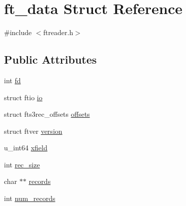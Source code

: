 \hypertarget{structft__data}{\section{ft\-\_\-data \-Struct \-Reference}
\label{structft__data}
}


{\ttfamily \#include $<$ftreader.\-h$>$}

\subsection*{\-Public \-Attributes}
\begin{DoxyCompactItemize}
\item 
int \hyperlink{structft__data_a6a6288892831b358a2f899cf3182467d}{fd}
\item 
struct ftio \hyperlink{structft__data_ab6231c0f90cc6f0dd190d52d6926d54b}{io}
\item 
struct fts3rec\-\_\-offsets \hyperlink{structft__data_a4e2b828b9122744d5cb7fb509d849679}{offsets}
\item 
struct ftver \hyperlink{structft__data_a936fc0f3ebdc017c5c8ea9a736f4fd37}{version}
\item 
u\-\_\-int64 \hyperlink{structft__data_ae802fc1e0fb8ee6c2a313790f09501a7}{xfield}
\item 
int \hyperlink{structft__data_a1512d3bba878f9017d2ce6a5881f38b9}{rec\-\_\-size}
\item 
char $\ast$$\ast$ \hyperlink{structft__data_a2135250dffa8caedbb2bd265ec4a9858}{records}
\item 
int \hyperlink{structft__data_a0ee5c9e9e607138986705fe248e54e7b}{num\-\_\-records}
\end{DoxyCompactItemize}


